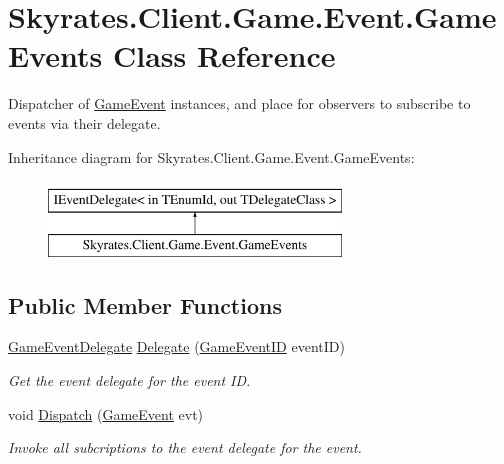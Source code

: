 \hypertarget{class_skyrates_1_1_client_1_1_game_1_1_event_1_1_game_events}{\section{Skyrates.\-Client.\-Game.\-Event.\-Game\-Events Class Reference}
\label{class_skyrates_1_1_client_1_1_game_1_1_event_1_1_game_events}
}


Dispatcher of \hyperlink{class_skyrates_1_1_client_1_1_game_1_1_event_1_1_game_event}{Game\-Event} instances, and place for observers to subscribe to events via their delegate.  


Inheritance diagram for Skyrates.\-Client.\-Game.\-Event.\-Game\-Events\-:\begin{figure}[H]
\begin{center}
\leavevmode
\includegraphics[height=2.000000cm]{class_skyrates_1_1_client_1_1_game_1_1_event_1_1_game_events}
\end{center}
\end{figure}
\subsection*{Public Member Functions}
\begin{DoxyCompactItemize}
\item 
\hyperlink{namespace_skyrates_1_1_client_1_1_game_1_1_event_a448e5d409dc993bd700f2f7f8161adf7}{Game\-Event\-Delegate} \hyperlink{class_skyrates_1_1_client_1_1_game_1_1_event_1_1_game_events_aef35aef1725ea32473c81becae252e1e}{Delegate} (\hyperlink{namespace_skyrates_1_1_client_1_1_game_1_1_event_a3a7e5dc62ad299d5e53abb4a3e5d5088}{Game\-Event\-I\-D} event\-I\-D)
\begin{DoxyCompactList}\small\item\em Get the event delegate for the event I\-D. \end{DoxyCompactList}\item 
void \hyperlink{class_skyrates_1_1_client_1_1_game_1_1_event_1_1_game_events_a039cc913141b24e8684f16d94b545b01}{Dispatch} (\hyperlink{class_skyrates_1_1_client_1_1_game_1_1_event_1_1_game_event}{Game\-Event} evt)
\begin{DoxyCompactList}\small\item\em Invoke all subcriptions to the event delegate for the event. \end{DoxyCompactList}\end{DoxyCompactItemize}
